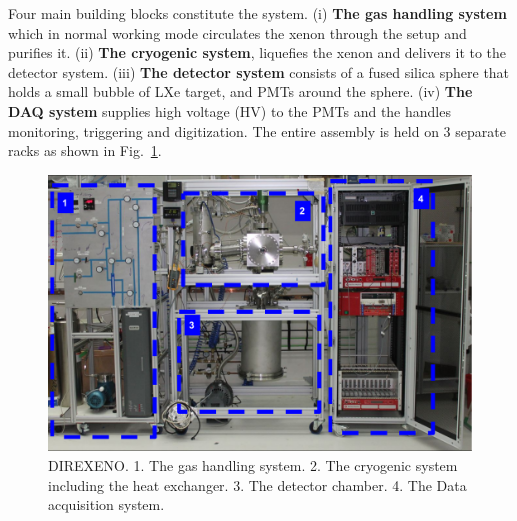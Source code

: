 Four main building blocks constitute the system. (i) \textbf{The gas handling system} which in normal working mode circulates the xenon through the setup and  purifies it. (ii) \textbf{The cryogenic system}, liquefies the xenon and 
delivers it to the detector system. (iii) \textbf{The detector system} consists of a fused silica sphere that 
holds a small bubble of LXe target, and PMTs around the sphere. (iv) \textbf{The DAQ system} supplies high voltage (HV) 
to the PMTs and the handles monitoring, triggering and digitization. The entire assembly is held on 3 separate racks as shown in Fig.~\ref{fig:fulldet}.
 






\begin{figure}[h]
\centerline{\includegraphics[width=0.8\linewidth]{FullSys.png}}
\caption{DIREXENO. 1. The gas handling system. 2. The cryogenic system including the heat exchanger. 3. The detector chamber. 4. The Data acquisition system.}
\label{fig:fulldet}
\end{figure}



